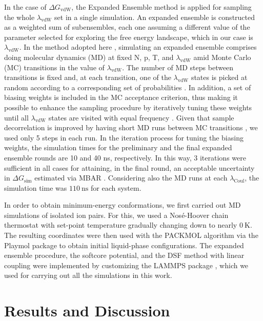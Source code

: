 \documentclass[3p,twocolumn]{elsarticle}
\begin{document}
In the case of $\Delta G_\text{vdW}$, the Expanded Ensemble method \cite{Lyubartsev_1992} is applied for sampling the whole $\lambda_\text{vdW}$ set in a single simulation.
An expanded ensemble is constructed as a weighted sum of subensembles, each one assuming a different value of the parameter selected for exploring the free energy landscape, which in our case is $\lambda_\text{vdW}$.
In the method adopted here \cite{Chodera_2011_2}, simulating an expanded ensemble comprises doing molecular dynamics (MD) at fixed N, p, T, and $\lambda_\text{vdW}$ amid Monte Carlo (MC) transitions in the value of $\lambda_\text{vdW}$.
The number of MD steps between transitions is fixed and, at each transition, one of the $\lambda_\text{vdW}$ states is picked at random according to a corresponding set of probabilities \cite{Chodera_2011_2}.
In addition, a set of biasing weights is included in the MC acceptance criterion, thus making it possible to enhance the sampling procedure by iteratively tuning these weights until all $\lambda_\text{vdW}$ states are visited with equal frequency \cite{Lyubartsev_1992}.
Given that sample decorrelation is improved by having short MD runs between MC transitions \cite{Chodera_2011_2}, we used only 5 steps in each run.
In the iteration process for tuning the biasing weights, the simulation times for the preliminary and the final expanded ensemble rounds are 10 and 40 ns, respectively.
In this way, 3 iterations were sufficient in all cases for attaining, in the final round, an acceptable uncertainty in $\Delta G_\text{sim}$ estimated via MBAR \cite{Shirts_2008, Klimovich_2015}. Considering also the MD runs at each $\lambda_{\text{Coul}}$, the simulation time was $110~\mathrm{ns}$ for each system.

In order to obtain minimum-energy conformations, we first carried out MD simulations of isolated ion pairs.
For this, we used a Nos\'{e}-Hoover chain thermostat \cite{Martyna1992} with set-point temperature gradually changing down to nearly $0~\text{K}$.
The resulting coordinates were then used with the PACKMOL algorithm \cite{Mart_nez_2009} via the Playmol package \cite{playmol} to obtain initial liquid-phase configurations.
The expanded ensemble procedure, the softcore potential, and the DSF method  with linear coupling were implemented by customizing the LAMMPS package \cite{Plimpton1995}, which we used for carrying out all the simulations in this work.

\section{Results and Discussion}
\label{sec:results}
\end{document}
